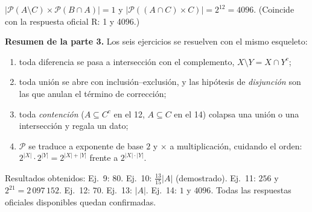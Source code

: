 \documentclass[11pt]{article}
\begin{document}
\begin{resp}
$|\mathcal{P}(A\setminus C)\times \mathcal{P}(B\cap A)| = 1$ \quad y \quad $|\mathcal{P}((A\cap C)\times C)| = 2^{12} = 4096$. \quad (Coincide con la respuesta oficial R: 1 y 4096.)
\end{resp}

\begin{nota}
\textbf{Resumen de la parte 3.} Los seis ejercicios se resuelven con el mismo esqueleto:
\begin{enumerate}[label=(\arabic*)]
  \item toda diferencia se pasa a intersección con el complemento, $X\setminus Y = X\cap Y^{c}$;
  \item toda unión se abre con inclusión--exclusión, y las hipótesis de \emph{disjunción} son las que anulan el término de corrección;
  \item toda \emph{contención} ($A\subseteq C^{c}$ en el 12, $A\subseteq C$ en el 14) colapsa una unión o una intersección y regala un dato;
  \item $\mathcal{P}$ se traduce a exponente de base $2$ y $\times$ a multiplicación, cuidando el orden: $2^{|X|}\cdot 2^{|Y|} = 2^{|X|+|Y|}$ frente a $2^{|X|\cdot|Y|}$.
\end{enumerate}
Resultados obtenidos: Ej.\ 9: $80$. \quad Ej.\ 10: $\tfrac{13}{15}|A|$ (demostrado). \quad Ej.\ 11: $256$ y $2^{21}=2\,097\,152$. \quad Ej.\ 12: $70$. \quad Ej.\ 13: $|A|$. \quad Ej.\ 14: $1$ y $4096$. Todas las respuestas oficiales disponibles quedan confirmadas.
\end{nota}
\end{document}
